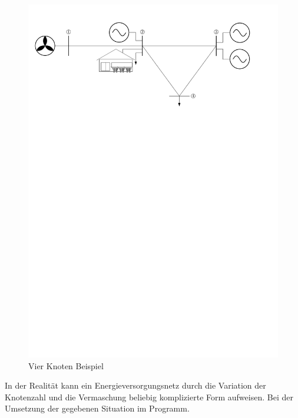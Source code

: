 \begin{figure}[h]
\caption{Vier Knoten Beispiel}
	\label{vkb}
	\begin{center}
	\includegraphics[scale=0.75]{images/SEVN/power_grid}
	\end{center}
\end{figure}

In der Realität kann ein Energieversorgungsnetz durch die Variation der
Knotenzahl und die Vermaschung beliebig komplizierte Form aufweisen. Bei der
Umsetzung der gegebenen Situation im Programm.

